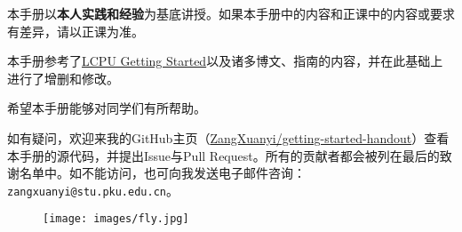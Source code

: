 \documentclass[../main.tex]{subfiles}
\begin{document}
本手册以\textbf{本人实践和经验}为基底讲授。如果本手册中的内容和正课中的内容或要求有差异，请以正课为准。

本手册参考了\href{https://missing.lcpu.dev}{LCPU Getting Started}以及诸多博文、指南的内容，并在此基础上进行了增删和修改。

希望本手册能够对同学们有所帮助。

如有疑问，欢迎来我的GitHub主页（\faGithub\href{https://github.com/ZangXuanyi/getting-started-handout}{ZangXuanyi/getting-started-handout}）查看本手册的源代码，并提出Issue与Pull Request。所有的贡献者都会被列在最后的致谢名单中。如不能访问，也可向我发送电子邮件咨询：\texttt{zangxuanyi@stu.pku.edu.cn}。

\begin{figure}[ht]
  \centering
  \texttt{[image: images/fly.jpg]}
\end{figure}
\end{document}
